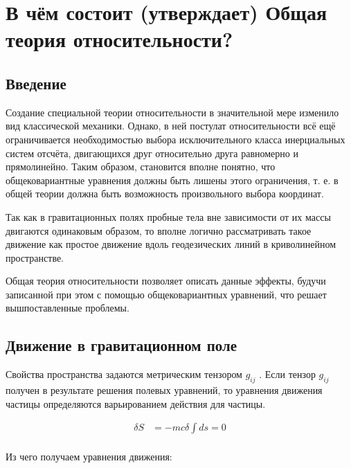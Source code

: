 \documentclass{article}
\begin{document}
  \maketitle
  \newpage
  
  

\section{В чём состоит (утверждает) Общая теория относительности?}

	\subsection{Введение}

		Создание специальной теории относительности в значительной мере изменило вид классической механики. Однако, в ней постулат относительности всё ещё ограничивается необходимостью выбора исключительного класса инерциальных систем отсчёта, двигающихся друг относительно друга равномерно и прямолинейно. Таким образом, становится вполне понятно, что общековариантные уравнения должны быть лишены этого ограничения, т. е. в общей теории должна быть возможность произвольного выбора координат.

		Так как в гравитационных полях пробные тела вне зависимости от их массы двигаются одинаковым образом, то вполне логично рассматривать такое движение как простое движение вдоль геодезических линий в криволинейном пространстве. 

		Общая теория относительности позволяет описать данные эффекты, будучи записанной при этом с помощью общековариантных уравнений, что решает вышпоставленные проблемы. 

	\subsection{Движение в гравитационном поле}

		Свойства пространства задаются метрическим тензором $ g_{ij} $ . Если тензор $ g_{ij} $
		получен в результате решения полевых уравнений, то уравнения движения частицы определяются варьированием действия для частицы. 

		\begin{align*}
			\delta S & = -mc \delta \int ds = 0 \\
		\end{align*}

		Из чего получаем уравнения движения:
\end{document}
